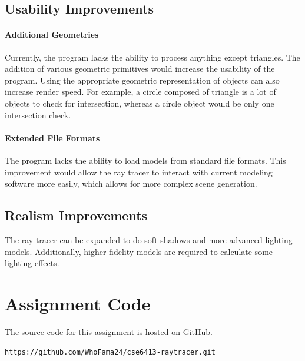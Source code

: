 \documentclass[letterpaper, 11pt, onecolumn, oneside]{article}
\begin{document}
    \subsection{Usability Improvements}
        \paragraph{Additional Geometries}
        Currently, the program lacks the ability to process anything except triangles.
        The addition of various geometric primitives would increase the usability of the program.
        Using the appropriate geometric representation of objects can also increase render speed.
        For example, a circle composed of triangle is a lot of objects to check for intersection, whereas a circle object would be only one intersection check.

        \paragraph{Extended File Formats}
        The program lacks the ability to load models from standard file formats.
        This improvement would allow the ray tracer to interact with current modeling software more easily, which allows for more complex scene generation.

    \subsection{Realism Improvements}
        The ray tracer can be expanded to do soft shadows and more advanced lighting models.
        Additionally, higher fidelity models are required to calculate some lighting effects.

\clearpage


\nocite{*}

\clearpage
\vspace*{\fill}
\section*{\centering Assignment Code}

\begin{center}
The source code for this assignment is hosted on GitHub.

\texttt{https://github.com/WhoFama24/cse6413-raytracer.git}
\end{center}
\vspace*{\fill}
\end{document}
